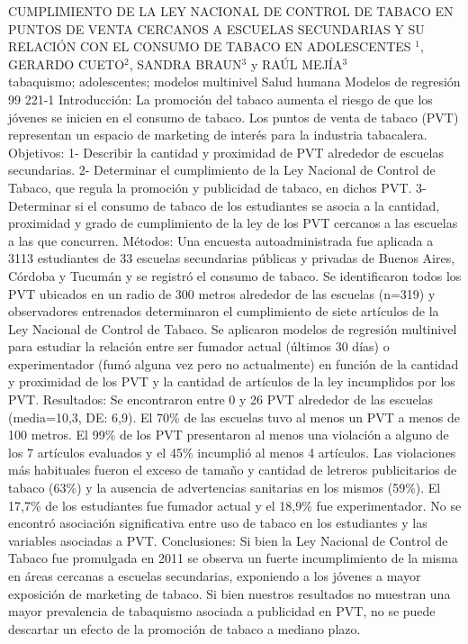 \A
{CUMPLIMIENTO DE LA LEY NACIONAL DE CONTROL DE TABACO EN PUNTOS DE VENTA CERCANOS A ESCUELAS SECUNDARIAS Y SU RELACIÓN CON EL CONSUMO DE TABACO EN ADOLESCENTES}
{$^1$, GERARDO CUETO$^2$, SANDRA BRAUN$^3$ y RAÚL MEJÍA$^3$}
{
\\}
{tabaquismo; adolescentes; modelos multinivel} 
 {Salud humana} 
 {Modelos de regresión} 
 {99} 
 {221-1}
{Introducción: La promoción del tabaco aumenta el riesgo de que los jóvenes se inicien en el consumo de tabaco. Los puntos de venta de tabaco (PVT) representan un espacio de marketing de interés para la industria tabacalera. Objetivos: 1- Describir la cantidad y proximidad de PVT alrededor de escuelas secundarias. 2- Determinar el cumplimiento de la Ley Nacional de Control de Tabaco, que regula la promoción y publicidad de tabaco, en dichos PVT. 3- Determinar si el consumo de tabaco de los estudiantes se asocia a la cantidad, proximidad y grado de cumplimiento de la ley de los PVT cercanos a las escuelas a las que concurren. Métodos: Una encuesta autoadministrada fue aplicada a 3113 estudiantes de 33 escuelas secundarias públicas y privadas de Buenos Aires, Córdoba y Tucumán y se registró el consumo de tabaco. Se identificaron todos los PVT ubicados en un radio de 300 metros alrededor de las escuelas (n=319) y observadores entrenados determinaron el cumplimiento de siete artículos de la Ley Nacional de Control de Tabaco. Se aplicaron modelos de regresión multinivel para estudiar la relación entre ser fumador actual (últimos 30 días) o experimentador (fumó alguna vez pero no actualmente) en función de la cantidad y proximidad de los PVT y la cantidad de artículos de la ley incumplidos por los PVT. Resultados: Se encontraron entre 0 y 26 PVT alrededor de las escuelas (media=10,3, DE: 6,9). El 70\% de las escuelas tuvo al menos un PVT a menos de 100 metros. El 99\% de los PVT presentaron al menos una violación a alguno de los 7 artículos evaluados y el 45\% incumplió al menos 4 artículos. Las violaciones más habituales fueron el exceso de tamaño y cantidad de letreros publicitarios de tabaco (63\%) y la ausencia de advertencias sanitarias en los mismos (59\%). El 17,7\% de los estudiantes fue fumador actual y el 18,9\% fue experimentador. No se encontró asociación significativa entre uso de tabaco en los estudiantes y las variables asociadas a PVT. Conclusiones: Si bien la Ley Nacional de Control de Tabaco fue promulgada en 2011 se observa un fuerte incumplimiento de la misma en áreas cercanas a escuelas secundarias, exponiendo a los jóvenes a mayor exposición de marketing de tabaco. Si bien nuestros resultados no muestran una mayor prevalencia de tabaquismo asociada a publicidad en PVT, no se puede descartar un efecto de la promoción de tabaco a mediano plazo.}
